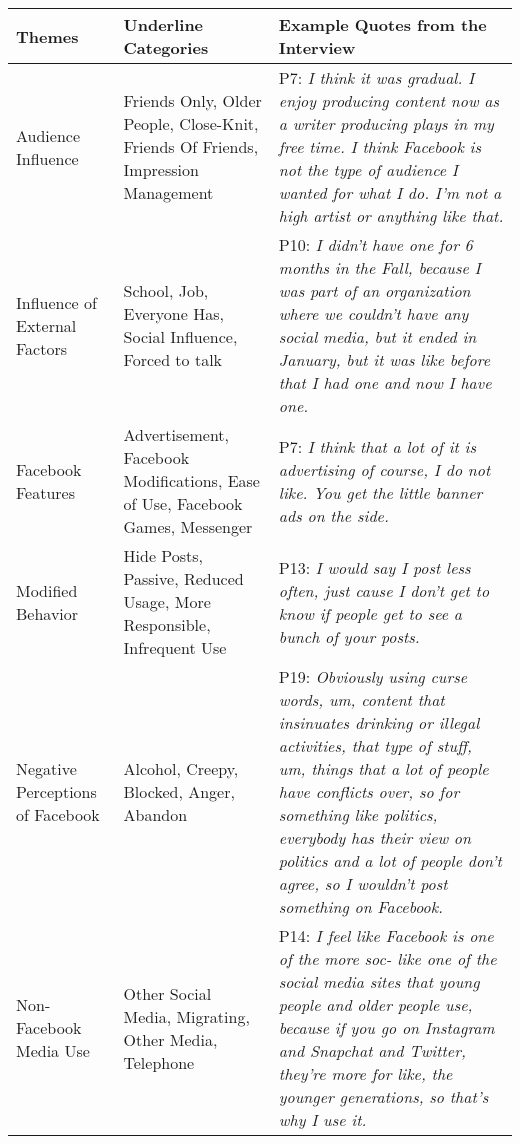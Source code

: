\begin{table*}[htb!]
\begin{tabular}{ |p{3cm}||p{4cm}|p{10cm}| }
 \hline
 Themes & Underline Categories & Example Quotes from the Interview\\
 \hline \hline
 Audience Influence & Friends Only, Older People, Close-Knit, Friends Of Friends, Impression Management&P7: \textit{I think it was gradual. I enjoy producing content now as a writer producing plays in my free time. I think Facebook is not the type of audience I wanted for what I do. I'm not a high artist or anything like that.}\\
 \hline
 Influence of External Factors &School, Job, Everyone Has, Social Influence, Forced to talk& P10: \textit{I didn't have one for 6 months in the Fall, because I was part of an organization where we couldn't have any social media, but it ended in January, but it was like before that I had one and now I have one.} \\
 \hline
 Facebook Features &Advertisement, Facebook Modifications, Ease of Use, Facebook Games, Messenger& P7: \textit{I think that a lot of it is advertising of course, I do not like. You get the little banner ads on the side.}\\
 \hline
 Modified Behavior & Hide Posts, Passive, Reduced Usage, More Responsible, Infrequent Use& P13: \textit{I would say I post less often, just cause I don't get to know if people get to see a bunch of your posts.} \\
 \hline
 Negative Perceptions of Facebook    & Alcohol, Creepy, Blocked, Anger, Abandon&P19: \textit{Obviously using curse words, um, content that insinuates drinking or illegal activities, that type of stuff, um, things that a lot of people have conflicts over, so for something like politics, everybody has their view on politics and a lot of people don't agree, so I wouldn't post something on Facebook.}  \\
 \hline
 Non-Facebook Media Use   & Other Social Media, Migrating, Other Media, Telephone& P14: \textit{I feel like Facebook is one of the more soc- like one of the social media sites that young people and older people use, because if you go on Instagram and Snapchat and Twitter, they're more for like, the younger generations, so that's why I use it.}\\

\end{tabular}
\end{table*}
